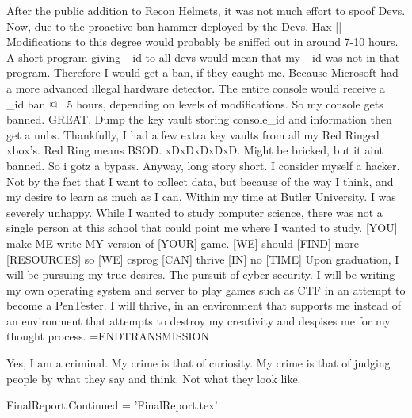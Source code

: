 After the public addition to Recon Helmets, it was not much effort to spoof Devs.
Now, due to the proactive ban hammer deployed by the Devs. Hax || Modifications to this degree
would probably be sniffed out in around 7-10 hours. A short program giving _id to all devs
would mean that my _id was not in that program. Therefore I would get a ban, if they caught me.
Because Microsoft had a more advanced illegal hardware detector. The entire console would receive
a _id ban @ ~5 hours, depending on levels of modifications. 
So my console gets banned. GREAT. Dump the key vault storing console_id and information
then get a nubs. Thankfully, I had a few extra key vaults from all my Red Ringed xbox's.
Red Ring means BSOD. xDxDxDxDxD. Might be bricked, but it aint banned. So i gotz a bypass.
Anyway, long story short. I consider myself a hacker. Not by the fact that I want to collect data,
but because of the way I think, and my desire to learn as much as I can. 
Within my time at Butler University. I was severely unhappy. While I wanted to study computer science,
there was not a single person at this school that could point me where I wanted to study.
[YOU] make {ME} write {MY} version of [YOUR] game.
[WE] should [FIND] more [RESOURCES] so [WE] csprog [CAN] thrive [IN] no [TIME]
Upon graduation, I will be pursuing my true desires. The pursuit of cyber security.
I will be writing my own operating system and server to play games such as CTF
in an attempt to become a PenTester. I will thrive, in an environment that supports me
instead of an environment that attempts to destroy my creativity and despises me for my thought process.
=ENDTRANSMISSION

Yes, I am a criminal. My crime is that of curiosity. 
My crime is that of judging people by what they say and think. 
Not what they look like.

FinalReport.Continued = 'FinalReport.tex'